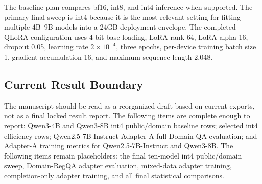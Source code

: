 The baseline plan compares bf16, int8, and int4 inference when supported. The
primary final sweep is int4 because it is the most relevant setting for fitting
multiple 4B--9B models into a 24GB deployment envelope. The completed QLoRA
configuration uses 4-bit base loading, LoRA rank 64, LoRA alpha 16, dropout
0.05, learning rate \(2\times10^{-4}\), three epochs, per-device training
batch size 1, gradient accumulation 16, and maximum sequence length 2,048.

\subsection{Current Result Boundary}

The manuscript should be read as a reorganized draft based on current exports,
not as a final locked result report. The following items are complete enough to
report: Qwen3-4B and Qwen3-8B int4 public/domain baseline rows; selected int4
efficiency rows; Qwen2.5-7B-Instruct Adapter-A full Domain-QA evaluation; and
Adapter-A training metrics for Qwen2.5-7B-Instruct and Qwen3-8B. The following
items remain placeholders: the final ten-model int4 public/domain sweep,
Domain-RegQA adapter evaluation, mixed-data adapter training, completion-only
adapter training, and all final statistical comparisons.
